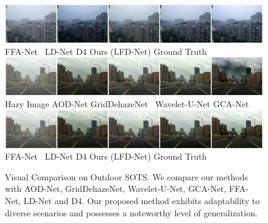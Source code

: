 \documentclass[lettersize,journal]{IEEEtran}
\begin{document}
\begin{figure}[ph!t]
    \includegraphics[width=16.5cm]{2_2.jpg} \\
    FFA-Net\cite{qin2020ffa} \qquad\quad\, LD-Net\cite{ullah2021light} \qquad\qquad\;\; D4\cite{yang2022d4} \qquad\qquad\; Ours (LFD-Net) \qquad\quad Ground Truth \\
    
    \includegraphics[width=16.5cm]{5_1.jpg} \\
    Hazy Image\qquad\quad\;\; AOD-Net\cite{li2017aod} \qquad GridDehazeNet\cite{liu2019griddehazenet} \;\, Wavelet-U-Net\cite{yang2019wavelet} \qquad GCA-Net\cite{chen2019gated}\\
    
    \includegraphics[width=16.5cm]{5_2.jpg} \\
    FFA-Net\cite{qin2020ffa} \qquad\quad\, LD-Net\cite{ullah2021light} \qquad\qquad\;\; D4\cite{yang2022d4} \qquad\qquad\; Ours (LFD-Net) \qquad\quad Ground Truth \\
    
    \caption{Visual Comparison on Outdoor SOTS. We compare our methods with AOD-Net\cite{li2017aod}, GridDehazeNet\cite{liu2019griddehazenet}, Wavelet-U-Net\cite{yang2019wavelet}, GCA-Net\cite{chen2019gated}, FFA-Net\cite{qin2020ffa}, LD-Net\cite{ullah2021light} and D4\cite{yang2022d4}. %
    Our proposed method exhibits adaptability to diverse scenarios and possesses a noteworthy level of generalization.}
    \label{sots}
\end{figure}
\end{document}
